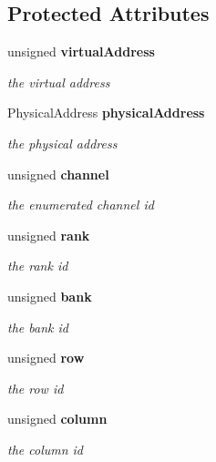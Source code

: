 \subsection*{Protected Attributes}
\begin{DoxyCompactItemize}
\item 
unsigned {\bf virtualAddress}\label{class_d_r_a_msim_i_i_1_1_address_ac666d19c4bb12632573fd0088e96cce4}

\begin{DoxyCompactList}\small\item\em the virtual address \item\end{DoxyCompactList}\item 
PhysicalAddress {\bf physicalAddress}\label{class_d_r_a_msim_i_i_1_1_address_a17b1f2891afb1c6427595f7386f8fd48}

\begin{DoxyCompactList}\small\item\em the physical address \item\end{DoxyCompactList}\item 
unsigned {\bf channel}\label{class_d_r_a_msim_i_i_1_1_address_a8fb5de009ae35aa5eb9ad6e8d80195b8}

\begin{DoxyCompactList}\small\item\em the enumerated channel id \item\end{DoxyCompactList}\item 
unsigned {\bf rank}\label{class_d_r_a_msim_i_i_1_1_address_a5da1fcbe9eb7e47322ff435b02e47a70}

\begin{DoxyCompactList}\small\item\em the rank id \item\end{DoxyCompactList}\item 
unsigned {\bf bank}\label{class_d_r_a_msim_i_i_1_1_address_aec81009e3aa060a1f81a686dead86b3d}

\begin{DoxyCompactList}\small\item\em the bank id \item\end{DoxyCompactList}\item 
unsigned {\bf row}\label{class_d_r_a_msim_i_i_1_1_address_ac5b4121363ce1d2d5a88ff829d6ecc84}

\begin{DoxyCompactList}\small\item\em the row id \item\end{DoxyCompactList}\item 
unsigned {\bf column}\label{class_d_r_a_msim_i_i_1_1_address_a68b6537f0906082c17eb906f4dbf1a4b}

\begin{DoxyCompactList}\small\item\em the column id \item\end{DoxyCompactList}\end{DoxyCompactItemize}

